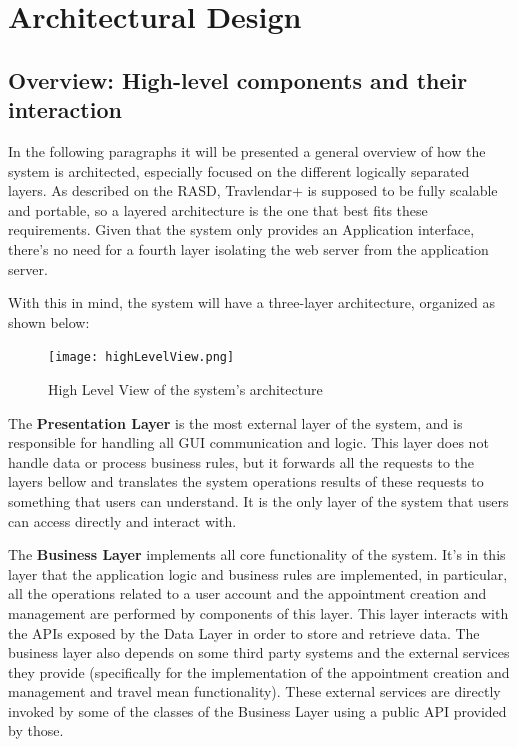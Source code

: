 \documentclass[12pt]{article}
\begin{document}
\section{Architectural Design}

\subsection{Overview: High-level components and their interaction}

In the following paragraphs it will be presented a general overview of how the system is architected, especially focused on the different logically separated layers.
As described on the RASD, Travlendar+ is supposed to be fully scalable and portable, so a layered architecture is the one that best fits these requirements. Given that the system only provides an Application interface, there's no need for a fourth layer isolating the web server from the application server. 

With this in mind, the system will have a three-layer architecture, organized as shown below:
\begin{figure}[H]
    \centering
    \texttt{[image: highLevelView.png]}
    \caption{High Level View of the system's architecture}
    \label{fig:highLevelView}
\end{figure}
The \textbf{Presentation Layer} is the most external layer of the system, and is responsible for handling all GUI communication and logic. This layer does not handle data or process business rules, but it forwards all the requests to the layers bellow and translates the system operations results of these requests to something that users can understand. It is the only layer of the system that users can access directly and interact with.

The \textbf{Business Layer} implements all core functionality of the system. It's in this layer that the application logic and business rules are implemented, in particular, all the operations related to a user account and the appointment creation and management are performed by components of this layer. This layer interacts with the APIs exposed by the Data Layer in order to store and retrieve data. The business layer also depends on some third party systems and the external services they provide (specifically for the implementation of the appointment creation and management and travel mean functionality). These external services are directly invoked by some of the classes of the Business Layer using a public API provided by those.
\end{document}
